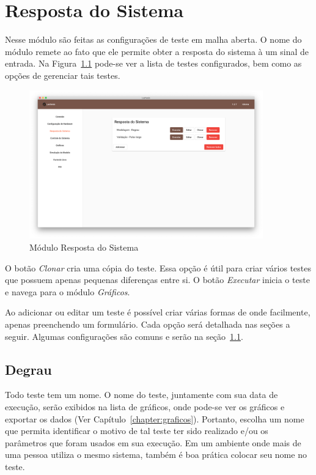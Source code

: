 
\chapter{Resposta do Sistema}%
\label{chapter:system-response}

Nesse módulo são feitas as configurações de teste em malha aberta. O nome do
módulo remete ao fato que ele permite obter a resposta do sistema à um sinal de
entrada. Na Figura~\ref{fig:system-response1} pode-se ver a lista de testes
configurados, bem como as opções de gerenciar tais testes.

\begin{figure}[ht!]
    \centering
    \includegraphics[width=0.9\textwidth]{imgs/system-response1}
    \caption[Módulo Resposta do Sistema]{Módulo Resposta do Sistema}%
    \label{fig:system-response1}
\end{figure}

O botão \textit{Clonar} cria uma cópia do teste. Essa opção é útil para criar
vários testes que possuem apenas pequenas diferenças entre si. O botão
\textit{Executar} inicia o teste e navega para o módulo \textit{Gráficos}.

Ao adicionar ou editar um teste é possível criar várias formas de onde
facilmente, apenas preenchendo um formulário. Cada opção será detalhada nas
seções a seguir. Algumas configurações são comuns e serão na
seção~\ref{sec:step}.

\section{Degrau}%
\label{sec:step}

Todo teste tem um nome. O nome do teste, juntamente com sua data de execução,
serão exibidos na lista de gráficos, onde pode-se ver os gráficos e exportar os
dados (Ver Capítulo~\ref{chapter:graficos}). Portanto, escolha um nome que
permita identificar o motivo de tal teste ter sido realizado e/ou os parâmetros
que foram usados em sua execução. Em um ambiente onde mais de uma pessoa utiliza
o mesmo sistema, também é boa prática colocar seu nome no teste.

